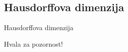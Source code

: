 \documentclass[10pt]{beamer}
\begin{document}
\subsection{Hausdorffova dimenzija}
\begin{frame}[t]{Hausdorffova dimenzija}

\end{frame}



\begin{frame}
  \centering
  \Huge Hvala za pozornost!
\end{frame}
\end{document}
